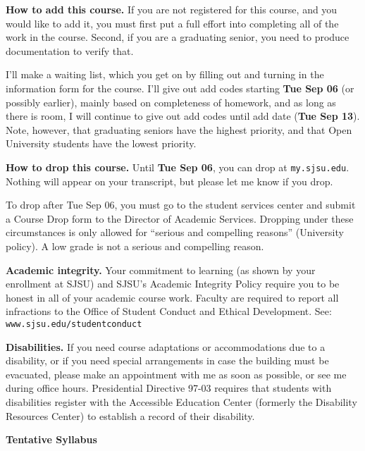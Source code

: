 \documentclass[letterpaper]{article}
\begin{document}
\newcommand{\adddate}{Tue Sep 13}
\newcommand{\dropdate}{Tue Sep 06}

{\bf How to add this course.\/} If you are not registered for this
course, and you would like to add it, you must first put a full effort
into completing all of the work in the course.  Second, if you are a
graduating senior, you need to produce documentation to verify that.

I'll make a waiting list, which you get on by filling out and turning
in the information form for the course.  I'll give out add codes
starting {\bf\dropdate\/} (or possibly earlier), mainly based on
completeness of homework, and as long as there is room, I will
continue to give out add codes until add date ({\bf\adddate\/}).
Note, however, that graduating seniors have the highest priority, and
that Open University students have the lowest priority.

{\bf How to drop this course.\/} Until {\bf\dropdate}, you can drop at
{\tt my.sjsu.edu}.  Nothing will appear on your transcript, but please
let me know if you drop.

To drop after \dropdate, you must go to the student services center
and submit a Course Drop form to the Director of Academic Services.
Dropping under these circumstances is only allowed for ``serious and
compelling reasons'' (University policy).  A low grade is not a serious
and compelling reason.

{\bf Academic integrity.\/} Your commitment to learning (as shown by
your enrollment at SJSU) and SJSU's Academic Integrity Policy require
you to be honest in all of your academic course work.  Faculty are
required to report all infractions to the Office of Student Conduct
and Ethical Development.  See: {\tt www.sjsu.edu/studentconduct\/}

{\bf Disabilities.\/} If you need course adaptations or accommodations
due to a disability, or if you need special arrangements in case the
building must be evacuated, please make an appointment with me as soon
as possible, or see me during office hours.  Presidential Directive
97-03 requires that students with disabilities register with the
Accessible Education Center
(formerly the Disability Resources Center) to establish a record of their
disability.

\bigskip


\centerline{\bf Tentative Syllabus}
\end{document}
